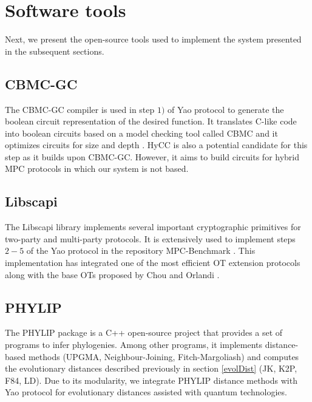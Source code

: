 \section{Software tools} \label{softTools}


Next, we present the open-source tools used to implement the system presented in the subsequent sections.

\subsection{CBMC-GC}

The CBMC-GC compiler \cite{F14} is used in step $1)$ of Yao protocol to generate the boolean circuit representation of the desired function. It translates C-like code into boolean circuits based on a model checking tool called CBMC and it optimizes circuits for size and depth \cite{Bscher2017, Buescher2016}. HyCC \cite{Bscher2018} is also a potential candidate for this step as it builds upon CBMC-GC. However, it aims to build circuits for hybrid MPC protocols in which our system is not based.

\subsection{Libscapi}

The Libscapi library \cite{libscapi} implements several important cryptographic primitives for two-party and multi-party protocols. It is extensively used to implement steps $2-5$ of the Yao protocol in the repository MPC-Benchmark \cite{mpc_benchmark}. This implementation has integrated one of the most efficient OT extension protocols \cite{K15} along with the base OTs proposed by Chou and Orlandi \cite{C15}.

\subsection{PHYLIP}

The PHYLIP package \cite{F89} is a C++ open-source project that provides a set of programs to infer phylogenies. Among other programs, it implements distance-based methods (UPGMA, Neighbour-Joining, Fitch-Margoliash) and computes the evolutionary distances described previously in section \ref{evolDist} (JK, K2P, F84, LD). Due to its modularity, we integrate PHYLIP distance methods with Yao protocol for evolutionary distances assisted with quantum technologies.




